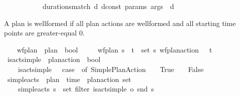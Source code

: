 \begin{isabellebody}
\ \ \ \ \ \ \ \ \ \ {\isasymand}\ durations{\isacharunderscore}{\kern0pt}match\ d\ dconst\ params\ args\ {\isasymand}\ d\ {\isasymge}\ {}{\isacharparenright}{\kern0pt}{\isachardoublequoteclose}%
\begin{isamarkuptext}%
A plan is wellformed if all plan actions are wellformed and all starting 
  time points are greater-equal 0.%
\end{isamarkuptext}\isamarkuptrue%
\ \ \isamarkupfalse%
\ wf{\isacharunderscore}{\kern0pt}plan\ {\isacharcolon}{\kern0pt}{\isacharcolon}{\kern0pt}\ {\isachardoublequoteopen}plan\ {\isasymRightarrow}\ bool{\isachardoublequoteclose}\ \isanewline
\ \ \ \ {\isachardoublequoteopen}wf{\isacharunderscore}{\kern0pt}plan\ {\isasympi}s\ {\isasymlongleftrightarrow}\ {\isacharparenleft}{\kern0pt}{\isasymforall}{\isacharparenleft}{\kern0pt}t{\isacharcomma}{\kern0pt}{\isasympi}{\isacharparenright}{\kern0pt}\ {\isasymin}\ set\ {\isasympi}s{\isachardot}{\kern0pt}\ wf{\isacharunderscore}{\kern0pt}plan{\isacharunderscore}{\kern0pt}action\ {\isasympi}\ {\isasymand}\ t\ {\isasymge}\ {}{\isacharparenright}{\kern0pt}{\isachardoublequoteclose}\isanewline
\isanewline
\ \ \isamarkupfalse%
\ is{\isacharunderscore}{\kern0pt}act{\isacharunderscore}{\kern0pt}simple\ {\isacharcolon}{\kern0pt}{\isacharcolon}{\kern0pt}\ {\isachardoublequoteopen}plan{\isacharunderscore}{\kern0pt}action\ {\isasymRightarrow}\ bool{\isachardoublequoteclose}\ \isanewline
\ \ \ \ {\isachardoublequoteopen}is{\isacharunderscore}{\kern0pt}act{\isacharunderscore}{\kern0pt}simple\ {\isasympi}\ {\isasymlongleftrightarrow}\ {\isacharparenleft}{\kern0pt}case\ {\isasympi}\ of\ {\isacharparenleft}{\kern0pt}Simple{\isacharunderscore}{\kern0pt}Plan{\isacharunderscore}{\kern0pt}Action\ {\isacharunderscore}{\kern0pt}\ {\isacharunderscore}{\kern0pt}{\isacharparenright}{\kern0pt}\ {\isasymRightarrow}\ True\ {\isacharbar}{\kern0pt}\ {\isacharunderscore}{\kern0pt}\ {\isasymRightarrow}\ False{\isacharparenright}{\kern0pt}{\isachardoublequoteclose}\isanewline
\isanewline
\ \ \isamarkupfalse%
\ simple{\isacharunderscore}{\kern0pt}acts\ {\isacharcolon}{\kern0pt}{\isacharcolon}{\kern0pt}\ {\isachardoublequoteopen}plan\ {\isasymRightarrow}\ {\isacharparenleft}{\kern0pt}time\ {\isasymtimes}\ plan{\isacharunderscore}{\kern0pt}action{\isacharparenright}{\kern0pt}\ set{\isachardoublequoteclose}\ \ \isanewline
\ \ \ \ {\isachardoublequoteopen}simple{\isacharunderscore}{\kern0pt}acts\ {\isasympi}s\ {\isacharequal}{\kern0pt}\ set\ {\isacharparenleft}{\kern0pt}filter\ {\isacharparenleft}{\kern0pt}is{\isacharunderscore}{\kern0pt}act{\isacharunderscore}{\kern0pt}simple\ o\ snd{\isacharparenright}{\kern0pt}\ {\isasympi}s{\isacharparenright}{\kern0pt}{\isachardoublequoteclose}\isanewline

\end{isabellebody}
